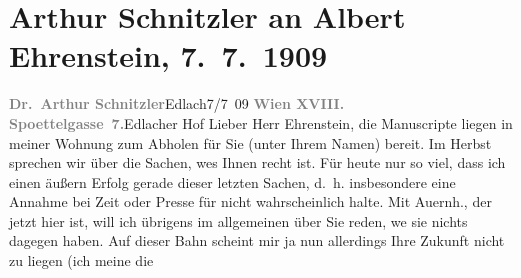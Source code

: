 

         
         \renewcommand{\erwaehntePersonen}{Personen: Raoul Auernheimer, Albert Ehrenstein}
         \renewcommand{\erwaehnteInstitutionen}{Institutionen: Neue Freie Presse}
         \renewcommand{\erwaehnteOrte}{Orte: Edlach, Edmund-Weiß-Gasse 7, Hotel Edlacherhof}
         \renewcommand{\erwaehnteWerke}{Werke: Die Zeit}
               \section[Arthur Schnitzler an Albert Ehrenstein, 7. 7. 1909]{ Arthur Schnitzler an Albert Ehrenstein, 7. 7. 1909}\nopagebreak{}\rehead{ }\begin{ledgroupsized}[t]{13cm}\normalsize\beginnumbering{} \toendnotes[C]{\smallbreak\pagebreak[2]} 
\pstart
           \noindent{}{\pb}\textcolor{gray}{\textbf{Dr. Arthur Schnitzler}}\hfill Edlach7/7 09\pend
           \pstart
           \textcolor{gray}{\textbf{Wien XVIII. Spoettelgasse 7.}}\hfill Edlacher Hof\pend
           \pstart{}Lieber Herr Ehrenstein,\pend\pstart
           die Manuscripte liegen in meiner Wohnung zum Abholen für Sie (unter Ihrem Namen)
               bereit.\pend
           \pstart
           Im Herbst sprechen wir über die Sachen, we{\geminationn}s Ihnen recht
               ist. Für heute nur so viel, {\pb}dass ich einen äußern Erfolg gerade
               dieser letzten Sachen, d. h. insbesondere eine Annahme bei Zeit oder Presse für nicht
               wahrscheinlich halte. Mit Auernh., der jetzt
               hier ist, will ich übrigens im allgemeinen über Sie reden, we{\geminationn} sie nichts dagegen haben. Auf dieser Bahn scheint mir
               ja nun {\pb}allerdings Ihre Zukunft nicht zu liegen (ich meine die

\end{ledgroupsized}
